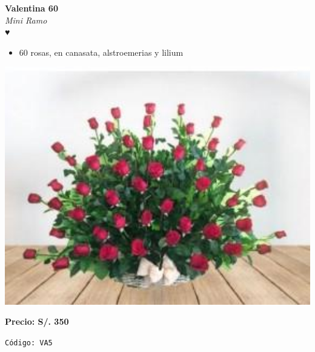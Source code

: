\documentclass[12pt]{article}
\begin{document}
\vspace{1cm}
\noindent
\begin{minipage}{0.6\textwidth}
    \textcolor[HTML]{FF8C00}{\textbf{\huge Valentina 60 }}\\
    {\textit{Mini Ramo}} \\
    \textcolor[HTML]{FF8C00}{\Huge ♥} \\
    \vspace{0.5cm}
    \begin{itemize}
        \item 60 rosas, en canasata, alstroemerias y lilium
    \end{itemize}
\end{minipage}
\hspace{1cm}
\begin{minipage}{0.35\textwidth}
    \includegraphics[width=1.0\textwidth]{imagenes_extraidas/image_11_4}
\end{minipage}
\vspace{0.3cm}
\begin{center}
   \textbf{\Large Precio: \textcolor[HTML]{228B22}{S/. 350 }}
\end{center}
\begin{center}
    \textcolor[HTML]{191970}{\texttt{Código: VA5}}
\end{center}
\vspace{1cm}
\end{document}
